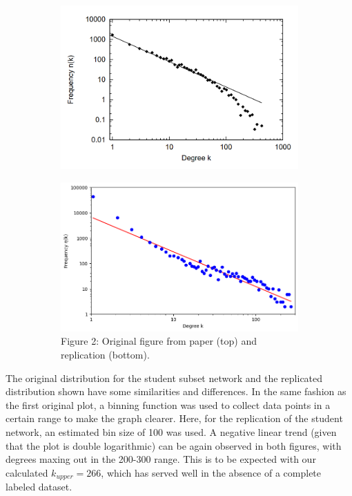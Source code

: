 \documentclass[11pt]{article}
\begin{document}
\begin{multicols}{2}
\begin{figure}[H]
  \centering
  \begin{subfigure}{0.9\linewidth}
    \centering
    \includegraphics[width=\linewidth]{figure2_original.png}
    \label{fig:figure2_original}
  \end{subfigure}
  \begin{subfigure}{0.8\linewidth}
    \centering
    \includegraphics[width=\linewidth]{figure2_replicated.png}
    \label{fig:figure2_replicated}
    \footnotesize{Figure 2: Original figure from paper (top) and replication (bottom).}
  \end{subfigure}
\end{figure}

The original distribution for the student subset network and the replicated distribution shown have some similarities and differences. In the same fashion as the first original plot, a binning function was used to collect data points in a certain range to make the graph clearer. Here, for the replication of the student network, an estimated bin size of 100 was used. A negative linear trend (given that the plot is double logarithmic) can be again observed in both figures, with degrees maxing out in the 200-300 range. This is to be expected with our calculated \(k_{upper}=266\), which has served well in the absence of a complete labeled dataset.


\end{multicols}
\end{document}
